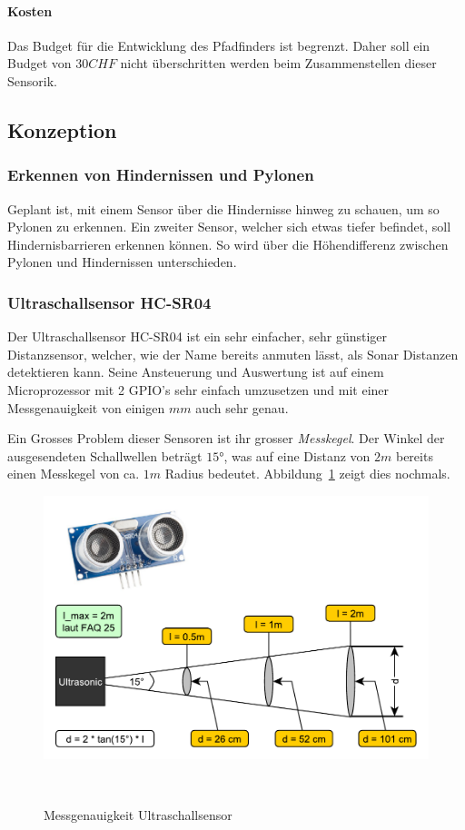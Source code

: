 \documentclass[main.tex]{subfiles} %
\begin{document}
\paragraph{Kosten}
Das Budget für die Entwicklung des Pfadfinders ist begrenzt. Daher soll ein
Budget von $30 CHF$ nicht überschritten werden beim Zusammenstellen dieser
Sensorik.

\subsection*{Konzeption}

\subsubsection*{Erkennen von Hindernissen und Pylonen}
Geplant ist, mit einem Sensor über die Hindernisse hinweg zu schauen, um so
Pylonen zu erkennen. Ein zweiter Sensor, welcher sich etwas tiefer befindet,
soll Hindernisbarrieren erkennen können. So wird über die Höhendifferenz
zwischen Pylonen und Hindernissen unterschieden.

\subsubsection*{Ultraschallsensor HC-SR04}
Der Ultraschallsensor HC-SR04 ist ein sehr einfacher, sehr günstiger Distanzsensor, welcher,
wie der Name bereits anmuten lässt, als Sonar Distanzen detektieren kann.
Seine Ansteuerung und Auswertung ist auf einem Microprozessor mit 2 GPIO's
sehr einfach umzusetzen und mit einer Messgenauigkeit von einigen $mm$ auch sehr genau.

Ein Grosses Problem dieser Sensoren ist ihr grosser \textit{Messkegel}. Der
Winkel der ausgesendeten Schallwellen beträgt $15°$, was auf eine Distanz von
$2m$ bereits einen Messkegel von ca. $1 m$ Radius bedeutet.
Abbildung~\ref{fig:Genauigkeit_Ultraschallsensor} zeigt dies nochmals.

\begin{figure}[h!]
    \centering
    \includegraphics[width=0.75\linewidth]{./fig_Hinderniserkennung/Auslesegenauigkeit_Ultraschall.pdf}
    \caption{Messgenauigkeit Ultraschallsensor}~\label{fig:Genauigkeit_Ultraschallsensor}
\end{figure}
\end{document}
